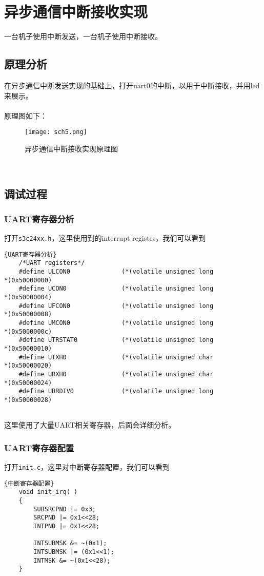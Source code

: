 \section{异步通信中断接收实现}
一台机子使用中断发送，一台机子使用中断接收。
\subsection{原理分析}
在异步通信中断发送实现的基础上，打开uart0的中断，以用于中断接收，并用led来展示。\\
\\
原理图如下：\\
\begin{figure}[htbp]
  \centering
  \texttt{[image: sch5.png]}
  \caption{异步通信中断接收实现原理图}
\end{figure}
\\

\subsection{调试过程}
\subsubsection{UART寄存器分析}
打开\lstinline{s3c24xx.h}，这里使用到的interrupt registes，我们可以看到
\lstset{language=C}

\begin{lstlisting}{UART寄存器分析}
    /*UART registers*/
    #define ULCON0              (*(volatile unsigned long *)0x50000000)
    #define UCON0               (*(volatile unsigned long *)0x50000004)
    #define UFCON0              (*(volatile unsigned long *)0x50000008)
    #define UMCON0              (*(volatile unsigned long *)0x5000000c)
    #define UTRSTAT0            (*(volatile unsigned long *)0x50000010)
    #define UTXH0               (*(volatile unsigned char *)0x50000020)
    #define URXH0               (*(volatile unsigned char *)0x50000024)
    #define UBRDIV0             (*(volatile unsigned long *)0x50000028)
    
\end{lstlisting}
这里使用了大量UART相关寄存器，后面会详细分析。

\subsubsection{UART寄存器配置}
打开\lstinline{init.c}，这里对中断寄存器配置，我们可以看到
\lstset{language=C}
\begin{lstlisting}{中断寄存器配置}
    void init_irq( )
    {
        SUBSRCPND |= 0x3;
        SRCPND |= 0x1<<28;
        INTPND |= 0x1<<28;
    
        INTSUBMSK &= ~(0x1);
        INTSUBMSK |= (0x1<<1);
        INTMSK &= ~(0x1<<28);
    }
\end{lstlisting}

